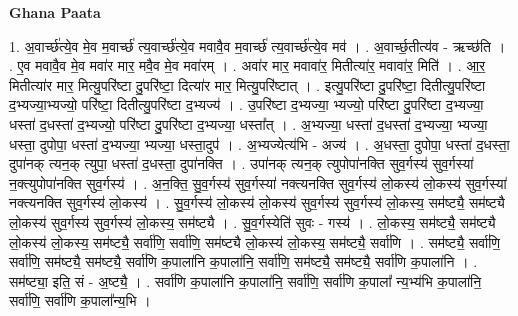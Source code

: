 \documentclass[17pt]{extarticle}
\begin{document}
\textbf{Ghana Paata } \newline

1. अ॒वार्च्छ॑त्ये॒व मे॒व म॒वार्च्छ॑ त्य॒वार्च्छ॑त्ये॒व मवावै॒व म॒वार्च्छ॑ त्य॒वार्च्छ॑त्ये॒व मव॑ । . अ॒वार्च्छ॒तीत्य॑व - ऋच्छ॑ति । . ए॒व मवावै॒व मे॒व मवा॑र मार॒ मवै॒व मे॒व मवा॑रम् । . अवा॑र मार॒ मवावा॑र॒ मितीत्या॑र॒ मवावा॑र॒ मिति॑ । . आ॒र॒ मितीत्या॑र मार॒ मित्यु॒परि॑ष्टा दु॒परि॑ष्टा॒ दित्या॑र मार॒ मित्यु॒परि॑ष्टात् । . इत्यु॒परि॑ष्टा दु॒परि॑ष्टा॒ दितीत्यु॒परि॑ष्टा द॒भ्यज्या॒भ्यज्यो॒ परि॑ष्टा॒ दितीत्यु॒परि॑ष्टा द॒भ्यज्य॑ । . उ॒परि॑ष्टा द॒भ्यज्या॒ भ्यज्यो॒ परि॑ष्टा दु॒परि॑ष्टा द॒भ्यज्या॒ धस्ता॑ द॒धस्ता॑ द॒भ्यज्यो॒ परि॑ष्टा दु॒परि॑ष्टा द॒भ्यज्या॒ धस्ता᳚त् । . अ॒भ्यज्या॒ धस्ता॑ द॒धस्ता॑ द॒भ्यज्या॒ भ्यज्या॒ धस्ता॒ दुपोपा॒ धस्ता॑ द॒भ्यज्या॒ भ्यज्या॒ धस्ता॒दुप॑ । . अ॒भ्यज्येत्य॑भि - अज्य॑ । . अ॒धस्ता॒ दुपोपा॒ धस्ता॑ द॒धस्ता॒ दुपा॑नक् त्यन॒क् त्युपा॒ धस्ता॑ द॒धस्ता॒ दुपा॑नक्ति । . उपा॑नक् त्यन॒क् त्युपोपा॑नक्ति सुव॒र्गस्य॑ सुव॒र्गस्या॑ न॒क्त्युपोपा॑नक्ति सुव॒र्गस्य॑ । . अ॒न॒क्ति॒ सु॒व॒र्गस्य॑ सुव॒र्गस्या॑ नक्त्यनक्ति सुव॒र्गस्य॑ लो॒कस्य॑ लो॒कस्य॑ सुव॒र्गस्या॑ नक्त्यनक्ति सुव॒र्गस्य॑ लो॒कस्य॑ । . सु॒व॒र्गस्य॑ लो॒कस्य॑ लो॒कस्य॑ सुव॒र्गस्य॑ सुव॒र्गस्य॑ लो॒कस्य॒ सम॑ष्ट्यै॒ सम॑ष्ट्यै लो॒कस्य॑ सुव॒र्गस्य॑ सुव॒र्गस्य॑ लो॒कस्य॒ सम॑ष्ट्यै । . सु॒व॒र्गस्येति॑ सुवः - गस्य॑ । . लो॒कस्य॒ सम॑ष्ट्यै॒ सम॑ष्ट्यै लो॒कस्य॑ लो॒कस्य॒ सम॑ष्ट्यै॒ सर्वा॑णि॒ सर्वा॑णि॒ सम॑ष्ट्यै लो॒कस्य॑ लो॒कस्य॒ सम॑ष्ट्यै॒ सर्वा॑णि । . सम॑ष्ट्यै॒ सर्वा॑णि॒ सर्वा॑णि॒ सम॑ष्ट्यै॒ सम॑ष्ट्यै॒ सर्वा॑णि क॒पाला॑नि क॒पाला॑नि॒ सर्वा॑णि॒ सम॑ष्ट्यै॒ सम॑ष्ट्यै॒ सर्वा॑णि क॒पाला॑नि । . सम॑ष्ट्या॒ इति॒ सं - अ॒ष्ट्यै॒ । . सर्वा॑णि क॒पाला॑नि क॒पाला॑नि॒ सर्वा॑णि॒ सर्वा॑णि क॒पाला᳚ न्य॒भ्य॑भि क॒पाला॑नि॒ सर्वा॑णि॒ सर्वा॑णि क॒पाला᳚न्य॒भि । \newline
\end{document}
